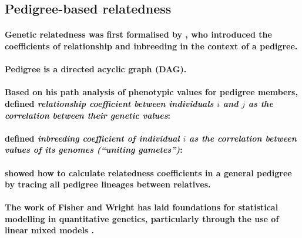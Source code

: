 

\subsection{Pedigree-based relatedness}

\paragraph{Genetic relatedness was first formalised by \cite{wright1922coefficients},
who introduced the coefficients of relationship and inbreeding in the
context of a pedigree.}

\paragraph{Pedigree is a directed acyclic graph (DAG).} 

\paragraph{Based on his path analysis of phenotypic values for pedigree
members, \cite{wright1922coefficients} defined
\textit{relationship coefficient between individuals $i$ and $j$ as the
correlation between their genetic values}:}

\paragraph{\cite{wright1922coefficients} defined
\textit{inbreeding coefficient of individual $i$ as the correlation
between values of its genomes (``uniting gametes'')}:}

\paragraph{\cite{wright1922coefficients} showed how to calculate
relatedness coefficients in a general pedigree by tracing all pedigree
lineages between relatives.}

\paragraph{The work of Fisher and Wright has laid foundations for
statistical modelling in quantitative genetics, particularly through the
use of linear mixed models
\citep{falconer1996introduction, henderson1984applications,
lynch1998genetics, mrode2023linear}.}

